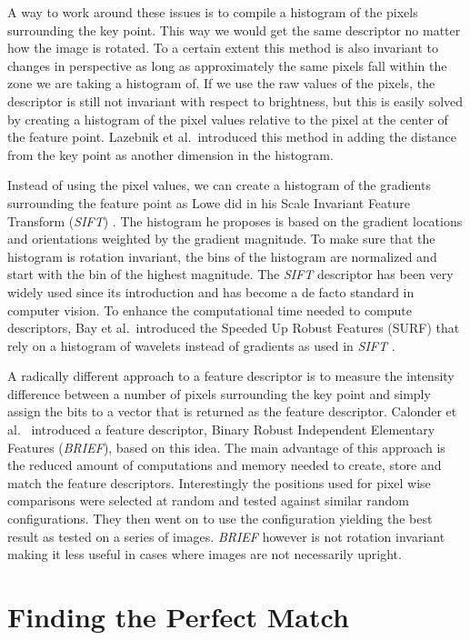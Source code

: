 A way to work around these issues is to compile a histogram of the 
pixels surrounding the key point. This way we would get the same 
descriptor no matter how the image is rotated. To a certain extent this
method is also invariant to changes in perspective as long as 
approximately the same pixels fall within the zone we are taking a 
histogram of. If we use the raw values of the pixels, the descriptor is 
still not invariant with respect to brightness, but this is easily 
solved by creating a histogram of the pixel values relative to the pixel 
at the center of the feature point.  Lazebnik et al.\ introduced this 
method in \cite{lazebnik2003sparse} adding the distance from the key 
point as another dimension in the histogram.

Instead of using the pixel values, we can create a histogram of the 
gradients surrounding the feature point as Lowe did in his Scale 
Invariant Feature Transform (\emph{SIFT}) \cite{lowe2004sift}. The 
histogram he proposes is based on the gradient locations and 
orientations weighted by
the gradient magnitude. To make sure that the histogram is rotation 
invariant, the bins of the histogram are normalized and start with the 
bin of the highest magnitude. The \emph{SIFT} descriptor has been very 
widely used since its introduction and has become a de facto standard in 
computer vision. To enhance the computational time needed to compute 
descriptors, Bay et al.\ introduced the Speeded Up Robust Features 
(SURF) that rely on a histogram of wavelets instead of gradients as used 
in \emph{SIFT} \cite{bay2006surf}. 

A radically different approach to a feature descriptor is to measure the
intensity difference between a number of pixels surrounding the key 
point and simply assign the bits to a vector that is returned as the 
feature descriptor. Calonder et al.\ \cite{calonder2010brief} introduced 
a feature descriptor, Binary Robust Independent Elementary Features 
(\emph{BRIEF}), based on this idea. The main advantage of this approach 
is the reduced amount of computations and memory needed to create, store 
and match the feature descriptors. Interestingly the positions used for 
pixel wise comparisons were selected at random and tested against 
similar random configurations. They then went on to use the 
configuration yielding the best result as tested on a series of images.  
\emph{BRIEF} however is not rotation invariant making it less useful in 
cases where images are not necessarily upright.

\section{Finding the Perfect Match}

